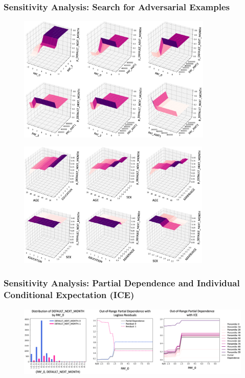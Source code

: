 \documentclass[11pt,
               aspectratio=43,
               hyperref={colorlinks}
               ]{beamer}
\begin{document}
			\begin{frame}[allowframebreaks]
		
				\frametitle{\textbf{Sensitivity Analysis}: Search for Adversarial Examples}
		
				\begin{figure}[htb]
					\begin{center}
						\includegraphics[height=170pt]{img/sa_max_prob.png}
					\end{center}
				\end{figure}	
				
				\framebreak
		
				\begin{figure}[htb]
					\begin{center}
						\includegraphics[height=170pt]{img/sa_max_prob_demo.png}
					\end{center}
				\end{figure}		
		
			\end{frame}
			
			\begin{frame}
		
				\frametitle{\textbf{Sensitivity Analysis}: Partial Dependence and Individual Conditional Expectation (ICE)}
		
				\begin{figure}[htb]
					\begin{center}
						\includegraphics[height=96pt]{img/pd.png}
					\end{center}
				\end{figure}	
		
			\end{frame}			
			
\end{document}
